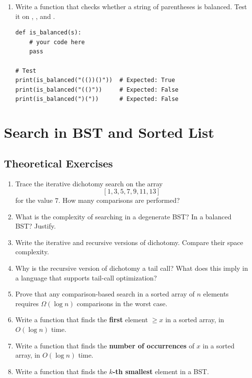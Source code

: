 \documentclass[11pt,a4paper]{article}
\newcommand{\code}[1]{\texttt{\detokenize{#1}}}
\newcommand{\easy}{$\star$}
\newcommand{\medium}{$\star\star$}
\newcommand{\hard}{$\star\star\star$}
\begin{document}
\begin{enumerate}[label=\textbf{2.\arabic*}, start=11]
    \item[\hard] Write a function \code{is_balanced(s)} that checks whether a string of parentheses is balanced. Test it on \code{"(())()"}, \code{"(()"}, and \code{")("}.
    \begin{lstlisting}
def is_balanced(s):
    # your code here
    pass

# Test
print(is_balanced("(())()"))  # Expected: True
print(is_balanced("(()"))     # Expected: False
print(is_balanced(")("))      # Expected: False
    \end{lstlisting}

\end{enumerate}

\section{Search in BST and Sorted List}

\subsection{Theoretical Exercises}

\begin{enumerate}[label=\textbf{3.\arabic*}]

    \item[\easy] Trace the iterative dichotomy search on the array
    \[
    [1, 3, 5, 7, 9, 11, 13]
    \]
    for the value $7$. How many comparisons are performed?

    \item[\easy] What is the complexity of searching in a degenerate BST? In a balanced BST? Justify.

    \item[\medium] Write the iterative and recursive versions of dichotomy. Compare their space complexity.

    \item[\medium] Why is the recursive version of dichotomy a tail call? What does this imply in a language that supports tail-call optimization?

    \item[\hard] Prove that any comparison-based search in a sorted array of $n$ elements requires $\Omega(\log n)$ comparisons in the worst case.

    \item[\medium] Write a function that finds the \textbf{first} element $\geq x$ in a sorted array, in $O(\log n)$ time.

    \item[\medium] Write a function that finds the \textbf{number of occurrences} of $x$ in a sorted array, in $O(\log n)$ time.

    \item[\hard] Write a function that finds the \textbf{$k$-th smallest} element in a BST.

\end{enumerate}
\end{document}
